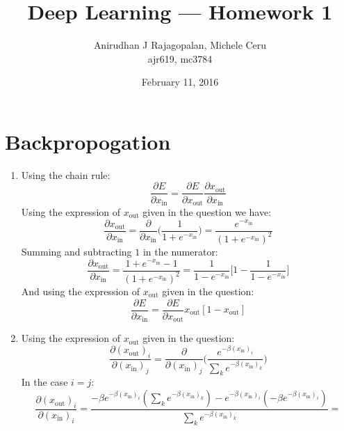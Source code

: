 \documentclass{article}
\begin{document}
\title{Deep Learning --- Homework 1}
\date{February 11, 2016}
\author{Anirudhan J Rajagopalan, Michele Ceru\\ ajr619, mc3784}

\maketitle

\newpage

\section[Expression for energy]{Backpropogation}
\begin{enumerate}
\item Using the chain rule:
$$
\frac{\partial E}{\partial x_{\text{in}}} = \frac{\partial E}{\partial x_{\text{out}}}\frac{\partial x_{\text{out}}}{\partial x_{\text{in}}}
$$  
Using the expression of $x_{\text{out}}$ given in the question we have:
$$
\frac{\partial x_{\text{out}}}{\partial x_{\text{in}}} = \frac{\partial }{\partial x_{\text{in}}} \big(\frac{1}{1+e^{-x_{\text{in}}}}\big) = \frac{e^{-x_{\text{in}}} }{(1+e^{-x_{\text{in}}})^2}
$$
Summing and subtracting $1$ in the numerator:
$$
\frac{\partial x_{\text{out}}}{\partial x_{\text{in}}}  = \frac{1+e^{-x_{\text{in}}} -1}{(1+e^{-x_{\text{in}}})^2}=\frac{1}{1-e^{-x_{\text{in}}}}\Big[  1-\frac{1}{1-e^{-x_{\text{in}}}}\Big]
$$
And using the expression of $x_{\text{out}}$ given in the question:
$$
\frac{\partial E}{\partial x_{\text{in}}} =\frac{\partial E}{\partial x_{\text{out}}}x_{\text{out}}[1-x_{\text{out}}]
$$

\item Using the expression of $x_{\text{out}}$ given in the question:
$$
\frac{\partial (x_{\text{out}})_i}{\partial (x_{\text{in}})_j} = \frac{\partial }{\partial (x_{\text{in}})_j} \Big(  
\frac{e^{-\beta (x_{\text{in}})_i}}{\sum_k e^{-\beta (x_{\text{in}})_k}}
\Big)
$$
In the case $i=j$:
$$
\frac{\partial (x_{\text{out}})_i}{\partial (x_{\text{in}})_i} =    
\frac{-\beta e^{-\beta (x_{\text{in}})_i} (\sum_k e^{-\beta (x_{\text{in}})_k} )- e^{-\beta (x_{\text{in}})_i} (-\beta e^{-\beta (x_{\text{in}})_i}   )
}
{\sum_k e^{-\beta (x_{\text{in}})_k}}=
$$


\end{enumerate}
\end{document}
